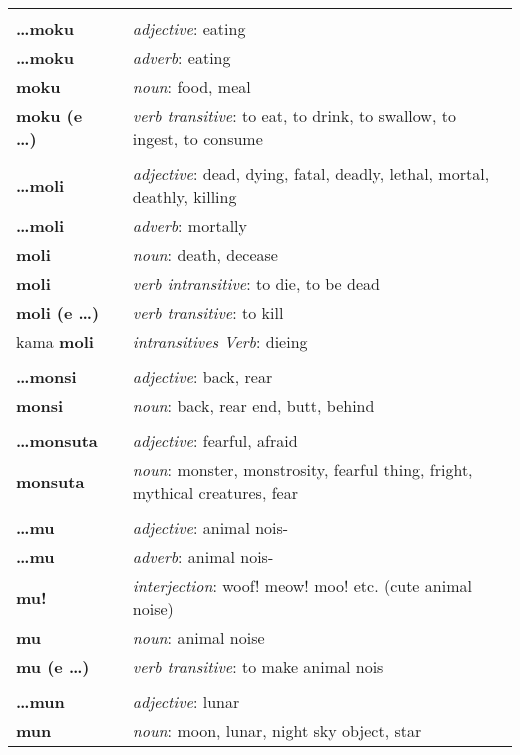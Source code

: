 \begin{supertabular}{p{2,5cm}|ll}
 && \\ %
\textbf{\dots moku} && \textit{adjective}: eating \\ 
\textbf{\dots moku} && \textit{adverb}: eating \\ 
\textbf{moku} && \textit{noun}: food, meal \\ 
\textbf{moku (e \dots)} && \textit{verb transitive}: to eat, to drink, to swallow, to ingest, to consume \\ 
 && \\ %
\textbf{\dots moli} && \textit{adjective}: dead, dying, fatal, deadly, lethal, mortal, deathly, killing \\ 
\textbf{\dots moli} && \textit{adverb}: mortally \\ 
\textbf{moli} && \textit{noun}: death, decease \\ 
\textbf{moli} && \textit{verb intransitive}: to die, to be dead \\ 
\textbf{moli (e \dots)} && \textit{verb transitive}: to kill \\ 
kama \textbf{moli} && \textit{intransitives Verb}: dieing \\ 
 && \\ %
\textbf{\dots monsi} && \textit{adjective}: back, rear \\ 
\textbf{monsi} && \textit{noun}: back, rear end, butt, behind \\ 
 && \\ %
\textbf{\dots monsuta} && \textit{adjective}: fearful, afraid \\ 
\textbf{monsuta} && \textit{noun}: monster, monstrosity, fearful thing, fright, mythical creatures, fear \\ 
 && \\ %
\textbf{\dots mu} && \textit{adjective}: animal nois- \\ 
\textbf{\dots mu} && \textit{adverb}: animal nois- \\ 
\textbf{mu!} && \textit{interjection}: woof! meow! moo! etc. (cute animal noise) \\ 
\textbf{mu} && \textit{noun}: animal noise \\ 
\textbf{mu (e \dots)} && \textit{verb transitive}: to make animal nois \\ 
 && \\ %
\textbf{\dots mun} && \textit{adjective}: lunar \\ 
\textbf{mun} && \textit{noun}: moon, lunar, night sky object, star \\ 

\end{supertabular}
